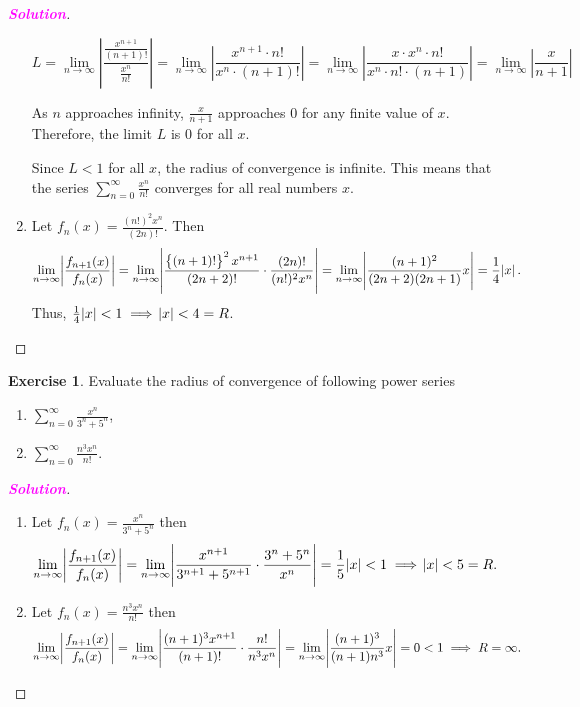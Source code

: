\documentclass[12pt,openany]{book}
\theoremstyle{definition}
\newtheorem{exercise}{Exercise}[chapter]
\newcommand{\sol}{\textcolor{magenta}{\bf Solution}}
\begin{document}
\begin{proof}[\sol]
\begin{enumerate}[1.]
			\[ L = \lim_{n \to \infty} \left| \frac{\frac{x^{n+1}}{(n+1)!}}{\frac{x^n}{n!}} \right|  = \lim_{n \to \infty} \left| \frac{x^{n+1} \cdot n!}{x^n \cdot (n+1)!} \right| = \lim_{n \to \infty} \left| \frac{x \cdot x^n \cdot n!}{x^n \cdot n! \cdot (n+1)} \right|  = \lim_{n \to \infty} \left| \frac{x}{n+1} \right| \]
			
			As \(n\) approaches infinity, \(\frac{x}{n+1}\) approaches 0 for any finite value of \(x\). Therefore, the limit \(L\) is 0 for all \(x\).
			
			Since \(L < 1\) for all \(x\), the radius of convergence is infinite. This means that the series \(\sum_{n=0}^{\infty} \frac{x^n}{n!}\) converges for all real numbers \(x\).
			
			\item Let $f_n(x)=\frac{(n!)^2x^n}{(2n)!}$. Then \begin{align*}
				\lim\limits_{n\to\infty}\abs{\frac{f_{n+1}(x)}{f_n(x)}}&=\lim\limits_{n\to\infty}\abs{\frac{\set{(n+1)!}^2x^{n+1}}{(2n+2)!}\cdot\frac{(2n)!}{(n!)^2x^n}}
				=\lim\limits_{n\to\infty}\abs{\frac{(n+1)^2}{(2n+2)(2n+1)}x}
				=\frac{1}{4}\abs{x}.
			\end{align*} Thus, $\frac{1}{4}\abs{x}<1\implies\abs{x}<4=R$.
		\end{enumerate}
	\end{proof}
	\begin{tcolorbox}[colframe=execolor, title={\color{white}\bf}]
		\begin{exercise}
			Evaluate the radius of convergence of following power series
			\begin{enumerate}
				\item \(\displaystyle\sum_{n=0}^{\infty} \frac{x^n}{3^n + 5^n}\),
				\item \(\displaystyle\sum_{n=0}^{\infty} \frac{n^3x^n}{n!}\).
			\end{enumerate}
		\end{exercise}
	\end{tcolorbox}
	\begin{proof}[\sol]
		\begin{enumerate}[1.]
			\item Let $\displaystyle f_n(x)=\frac{x^n}{3^n+5^n}$ then \begin{align*}
				\lim\limits_{n\to\infty}\abs{\frac{f_{n+1}(x)}{f_n(x)}}&=\lim\limits_{n\to\infty}\abs{\frac{x^{n+1}}{3^{n+1}+5^{n+1}}\cdot\frac{3^n+5^n}{x^n}}=\frac{1}{5}\abs{x}<1\implies\abs{x}<5=R.
			\end{align*}
			\item Let $\displaystyle f_n(x)=\frac{n^3x^n}{n!}$ then \begin{align*}
				\lim\limits_{n\to\infty}\abs{\frac{f_{n+1}(x)}{f_n(x)}}&=\lim\limits_{n\to\infty}\abs{\frac{(n+1)^3x^{n+1}}{(n+1)!}\cdot\frac{n!}{n^3x^{n}}}=\lim\limits_{n\to\infty}\abs{\frac{(n+1)^3}{(n+1)n^3}x}=0<1\implies R=\infty.
			\end{align*}
		\end{enumerate}
	\end{proof}
\end{document}
